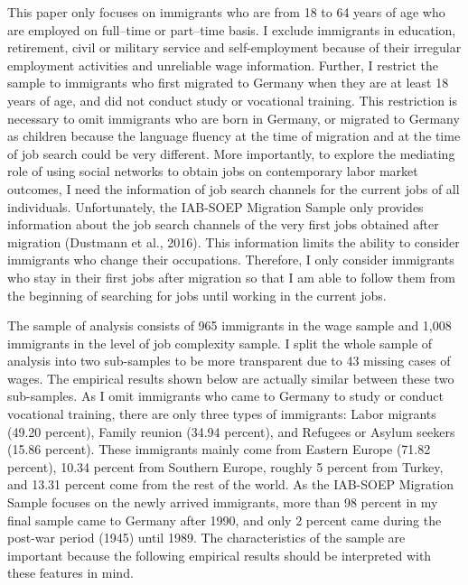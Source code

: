 \documentclass[12pt,a4paper]{article}
\begin{document}
This paper only focuses on immigrants who are from 18 to 64 years of age who are employed on full--time or part--time basis. I exclude immigrants in education, retirement, civil or military service and self-employment because of their irregular employment activities and unreliable wage information. Further, I restrict the sample to immigrants who first migrated to Germany when they are at least 18 years of age, and did not conduct study or vocational training. This restriction is necessary to omit immigrants who are born in Germany, or migrated to Germany as children because the language fluency at the time of migration and at the time of job search could be very different. More importantly, to explore the mediating role of using social networks to obtain jobs on contemporary labor market outcomes, I need the information of job search channels for the current jobs of all individuals. Unfortunately, the IAB-SOEP Migration Sample only provides information about the job search channels of the very first jobs obtained after migration (Dustmann et al., 2016). This information limits the ability to consider immigrants who change their occupations. Therefore, I only consider immigrants who stay in their first jobs after migration so that I am able to follow them from the beginning of searching for jobs until working in the current jobs. 

The sample of analysis consists of 965 immigrants in the wage sample and 1,008 immigrants in the level of job complexity sample. I split the whole sample of analysis into two sub-samples to be more transparent due to 43 missing cases of wages. The empirical results shown below are actually similar between these two sub-samples. As I omit immigrants who came to Germany to study or conduct vocational training, there are only three types of immigrants: Labor migrants (49.20 percent), Family reunion (34.94 percent), and Refugees or Asylum seekers (15.86 percent). These immigrants mainly come from Eastern Europe (71.82 percent), 10.34 percent from Southern Europe, roughly 5 percent from Turkey, and 13.31 percent come from the rest of the world. As the IAB-SOEP Migration Sample focuses on the newly arrived immigrants, more than 98 percent in my final sample came to Germany after 1990, and only 2 percent came during the post-war period (1945) until 1989. The characteristics of the sample are important because the following empirical results should be interpreted with these features in mind.
\end{document}
